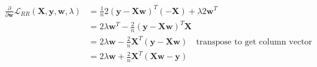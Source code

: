 \newcommand{\matrix}[1]{\mathbf{#1}}
\newcommand{\vector}[1]{\mathbf{#1}}
\newcommand{\X}{\matrix{X}}
\newcommand{\y}{\vector{y}}
\newcommand{\w}{\vector{w}}
\begin{align*}
\frac{\partial}{\partial \w} \mathcal{L}_{RR} (\X,\y,\w,\lambda) &= \frac{1}{n} 2(\y - \X\w)^T (-\X) + \lambda 2 \w^T \\
&= 2 \lambda \w^T - \frac{2}{n} (\y - \X\w)^T \X \\
&= 2 \lambda \w - \frac{2}{n} \X^T (\y - \X\w) \quad \text{transpose to get column vector} \\
&= 2 \lambda \w + \frac{2}{n} \X^T (\X\w - \y) \\
\end{align*}
